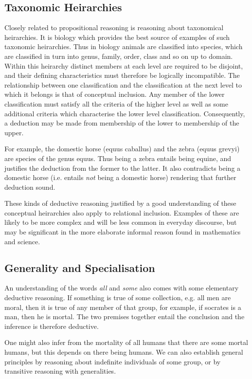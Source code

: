 \documentclass[10pt,titlepage]{book}
\begin{document}
\subsection{Taxonomic Heirarchies}

Closely related to propositional reasoning is reasoning about taxonomical heirarchies.
It is biology which provides the best source of examples of such taxonomic heirarchies.
Thus in biology animals are classified into species, which are classified in turn into genus, family, order, class and so on up to domain.
Within this heirarchy distinct members at each level are required to be disjoint, and their defining characteristics must therefore be logically incompatible.
The relationship between one classification and the classification at the next level to which it belongs is that of conceptual inclusion.
Any member of the lower classification must satisfy all the criteria of the higher level as well as some additional criteria which characterise the lower level classification.
Consequently, a deduction may be made from membership of the lower to membership of the upper.

For example, the domestic horse (equus caballus) and the zebra (equus grevyi) are species of the genus equus.
Thus being a zebra entails being equine, and justifies the deduction from the former to the latter.
It also contradicts being a domestic horse (i.e. entails \emph{not} being a domestic horse) rendering that further deduction sound.

These kinds of deductive reasoning justified by a good understanding of these conceptual heirarchies also apply to relational inclusion.
Examples of these are likely to be more complex and will be less common in everyday discourse, but may be significant in the more elaborate informal reason found in mathematics and science.

\subsection{Generality and Specialisation}

An understanding of the words \emph{all} and \emph{some} also comes with some elementary deductive reasoning.
If something is true of some collection, e.g. all men are moral, then it is true of any member of that group, for example, if socrates is a man, then he is mortal.
The two premises together entail the conclusion and the inference is therefore deductive.

One might also infer from the mortality of all humans that there are some mortal humans, but this depends on there being humans.
We can also establish general principles by reasoning about indefinite individuals of some group, or by transitive reasoning with generalities.
\end{document}
